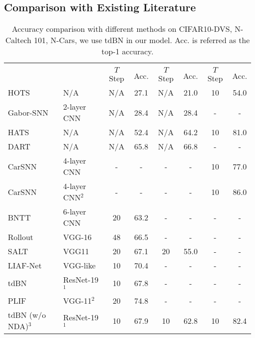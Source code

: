 \documentclass[runningheads]{llncs}
\newcommand{\bftab}{\fontseries{b}\selectfont}
\begin{document}
\subsection{Comparison with Existing Literature}
\label{sec_compare}


\begin{table}[t]
   \caption{Accuracy comparison with different methods on CIFAR10-DVS, N-Caltech 101, N-Cars, we use tdBN in our model. Acc. is referred as the top-1 accuracy. }
   \centering
   \begin{adjustbox}{max width=\linewidth}
   \begin{tabular}{llcccccc}
   \toprule 
   \multirow{2}{4em}{\bftab{Method}} &\multirow{2}{4em}{\bftab{Model}}  & \multicolumn{2}{c}{\bftab{CIFAR10-DVS}} & \multicolumn{2}{c}{\bftab{N Caltech-101}} & \multicolumn{2}{c}{\bftab{N-Cars}} \\
   \cmidrule(l{2pt}r{2pt}){3-4}\cmidrule(l{2pt}r{2pt}){5-6}\cmidrule(l{2pt}r{2pt}){7-8}
    & & {$T$ Step} & {Acc.} & {$T$ Step} & {Acc.} & {$T$ Step} & {Acc.} \\
   \midrule
   HOTS~\cite{lagorce2016hots} & N/A & N/A & 27.1 & N/A & 21.0 & 10 & 54.0 \\ 
   Gabor-SNN~\cite{sironi2018hats} & 2-layer CNN & N/A &  28.4 & N/A & 28.4 & - & - \\ 
   HATS~\cite{sironi2018hats} & N/A & N/A & 52.4 & N/A & 64.2 & 10 & 81.0 \\ 
DART~\cite{ramesh2019dart} & N/A & N/A & 65.8 & N/A & 66.8& - & - \\
    CarSNN~\cite{viale2021carsnn} & 4-layer CNN & - & -  & - & - & 10 & 77.0 \\
    CarSNN~\cite{viale2021carsnn} & 4-layer CNN$^2$ & - & -  & - & - & 10 & 86.0 \\
   BNTT~\cite{kim2020revisiting} & 6-layer CNN & 20 & 63.2 & - & - & - & - \\
   Rollout~\cite{kugele2020efficient} & VGG-16 & 48 & 66.5 & - & - & - & - \\
   SALT~\cite{kim2021optimizing} &  VGG11 & 20 & 67.1 & 20 & 55.0 & - & -\\ 
   LIAF-Net~\cite{wu2021liaf} & VGG-like & 10 & 70.4 & - & - & - & -\\ 
  tdBN~\cite{zheng2020going} & ResNet-19$^1$ & 10 & 67.8 & - & -& - & - \\
   PLIF~\cite{fang2021incorporating} & VGG-11$^2$ & 20 & 74.8 & - & - & - & -\\
   \midrule
   tdBN (w/o NDA)$^3$ & ResNet-19$^1$ & 10 & 67.9 & 10 & 62.8 & 10 & 82.4 \\

\end{tabular}
\end{adjustbox}
\end{table}
\end{document}
